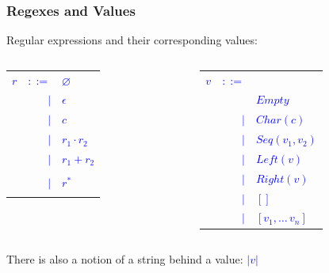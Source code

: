 \documentclass[dvipsnames,14pt,t]{beamer}
\newcommand{\bl}[1]{\textcolor{blue}{#1}}
\begin{document}
\begin{frame}[c]
\frametitle{Regexes and Values}

Regular expressions and their corresponding values:

\begin{center}
\begin{columns}
\begin{column}{3cm}
\begin{tabular}{@{}rrl@{}}
  \bl{$r$} & \bl{$::=$}  & \bl{$\varnothing$}\\
           & \bl{$\mid$} & \bl{$\epsilon$}   \\
           & \bl{$\mid$} & \bl{$c$}          \\
           & \bl{$\mid$} & \bl{$r_1 \cdot r_2$}\\
           & \bl{$\mid$} & \bl{$r_1 + r_2$}   \\
  \\
           & \bl{$\mid$} & \bl{$r^*$}         \\
  \\
  \end{tabular}
\end{column}
\begin{column}{3cm}
\begin{tabular}{@{\hspace{-7mm}}rrl@{}}
  \bl{$v$} & \bl{$::=$}  & \\
           &             & \bl{$Empty$}   \\
           & \bl{$\mid$} & \bl{$Char(c)$}          \\
           & \bl{$\mid$} & \bl{$Seq(v_1,v_2)$}\\
           & \bl{$\mid$} & \bl{$Left(v)$}   \\
           & \bl{$\mid$} & \bl{$Right(v)$}  \\
           & \bl{$\mid$} & \bl{$[]$}      \\
           & \bl{$\mid$} & \bl{$[v_1,\ldots\,v_n]$} \\
  \end{tabular}
\end{column}
\end{columns}
\end{center}\pause

There is also a notion of a string behind a value: \bl{$|v|$}

\end{frame}
\end{document}
